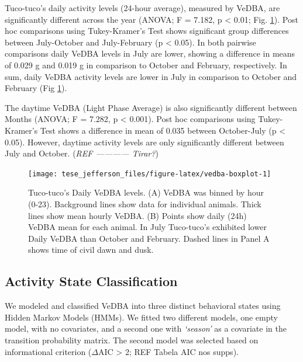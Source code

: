 \documentclass[english,msc,numbers,hidelinks]{coppe}
\begin{document}
  Tuco-tuco's daily activity levels (24-hour average), measured by VeDBA, are significantly different across the year (ANOVA; F = 7.182, p \textless{} 0.01; Fig. \ref{fig:vedba-boxplot}). Post hoc comparisons using Tukey-Kramer's Test shows significant group differences between July-October and July-February (p \textless{} 0.05). In both pairwise comparisons daily VeDBA levels in July are lower, showing a difference in means of 0.029 g and 0.019 g in comparison to October and February, respectively. In sum, daily VeDBA activity levels are lower in July in comparison to October and February (Fig \ref{fig:vedba-boxplot}).

  The daytime VeDBA (Light Phase Average) is also significantly different between Months (ANOVA; F = 7.282, p \textless{} 0.001). Post hoc comparisons using Tukey-Kramer's Test shows a difference in mean of 0.035 between October-July (p \textless{} 0.05). However, daytime activity levels are only significantly different between July and October. (\emph{REF ------------ Tirar?})
  \begin{figure}

  {\centering \texttt{[image: tese\_jefferson\_files/figure-latex/vedba-boxplot-1]} 

  }

  \caption{Tuco-tuco's Daily VeDBA levels. (A) VeDBA was binned by hour (0-23). Background lines show data for individual animals. Thick lines show mean hourly VeDBA. (B) Points show daily (24h) VeDBA mean for each animal. In July Tuco-tuco's exhibited lower Daily VeDBA than October and February. Dashed lines in Panel A shows time of civil dawn and dusk.}\label{fig:vedba-boxplot}
  \end{figure}
  \hypertarget{activity-state-classification}{%
  \subsection{Activity State Classification}\label{activity-state-classification}}

  We modeled and classified VeDBA into three distinct behavioral states using Hidden Markov Models (HMMs). We fitted two different models, one empty model, with no covariates, and a second one with \emph{`season'} as a covariate in the transition probability matrix. The second model was selected based on informational criterion (\(\Delta\)AIC \textgreater{} 2; REF Tabela AIC nos supps).
\end{document}
